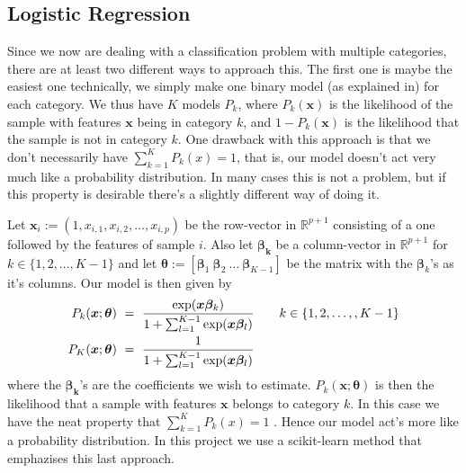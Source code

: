 \documentclass[parskip=half]{scrartcl}
\theoremstyle{definition}
\theoremstyle{remark}
\newcommand{\R}{\mathbb{R}}
\begin{document}
\subsection{Logistic Regression}
Since we now are dealing with a classification problem with multiple
categories, there are at least two different ways to approach this. 
The first one is maybe the easiest one technically, we simply make
one binary model (as explained in\cite{proj2}) 
for each category. We thus have $K$ models $P_k$, 
where $P_k(\bm{x})$ is the likelihood of the sample with 
features $\bm{x}$ being in category $k$, and $1 - P_k(\bm{x})$ is
the likelihood that the sample is not in category $k$. One 
drawback with this approach is that we don't necessarily
have $\sum_{k=1}^K P_k(x) = 1$, that is, our model doesn't
act very much like a probability distribution. 
In many cases this is not a problem, but if this property is desirable
there's a slightly different way of doing it.
\par
Let $\bm{x}_i := (1, x_{i,1}, x_{i,2}, \dots, x_{i,p})$ 
be the row-vector in $\R^{p+1}$ consisting of a one followed by the 
features of sample $i$. Also let $\bm{\beta_k}$ be a column-vector in 
$\R^{p+1}$ for $k \in \{1,2, \dots, K-1\}$ and let 
$\bm{\theta} := [\bm{\beta}_1 \ \bm{\beta}_2 \ \dots \ \bm{\beta}_{K-1}]$ 
be the matrix with the $\bm{\beta}_k$'s as it's columns.
Our model is then given by
\begin{equation}
    \begin{split}
        P_k(\bm{x}; \bm{\theta}) \ = \ 
        \frac{\exp(\bm{x \beta}_k)}
        {1 + \sum_{l=1}^{K-1} \exp(\bm{x\beta_}l)}
        & \quad \quad k \in \{1,2, \dots, ,K - 1\}  \\
        P_K(\bm{x}; \bm{\theta}) \ = \ 
        \frac{1}
        {1 + \sum_{l=1}^{K-1} \exp(\bm{x\beta_}l)}
    \end{split}
\end{equation}
where the ${\bm{\beta_k}}$'s are the 
coefficients we wish to estimate. $P_k(\bm{x}; \bm{\theta})$ is then the 
likelihood that a sample with features $\bm{x}$ belongs to category $k$.
In this case we have the neat property that $\sum_{k=1}^K P_k(x) = 1$
\cite{htf:esl}.
Hence our model act's more like a probability distribution. In this project
we use a scikit-learn method that emphazises this last approach.
\par
\end{document}

